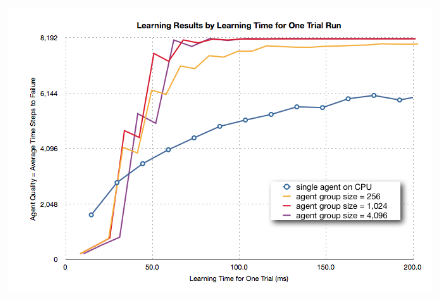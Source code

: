 \documentclass[11pt]{article} %
\begin{document}
\begin{flushleft}

\end{flushleft}

\begin{figure}[hbtp]
\center
\includegraphics[scale=0.5]{fig10a}
\caption{}
\label{fig:pole_timediff}
\end{figure}
\end{document}
